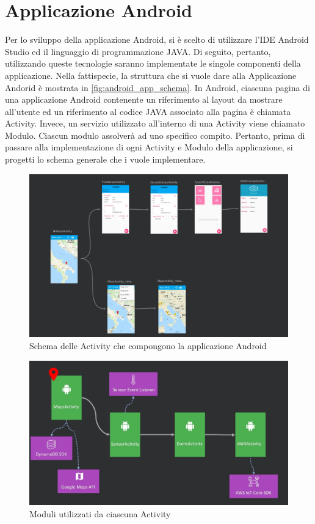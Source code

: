 \section{Applicazione Android}
Per lo sviluppo della applicazione Android, si è scelto di utilizzare l'IDE Android Studio ed il linguaggio di programmazione JAVA. Di seguito, pertanto, utilizzando queste tecnologie saranno implementate le singole componenti della applicazione. Nella fattispecie, la struttura che si vuole dare alla Applicazione Andorid è mostrata in \autoref{fig:android_app_schema}.
In Android, ciascuna pagina di una applicazione Android contenente un riferimento al layout da mostrare all'utente ed un riferimento al codice JAVA associato alla pagina è chiamata Activity. Invece, un servizio utilizzato all'interno di una Activity viene chiamato Modulo. Ciascun modulo assolverà ad uno specifico compito. Pertanto, prima di passare alla implementazione di ogni Activity e Modulo della applicazione, si progetti lo schema generale che i vuole implementare.\\
\begin{figure}
	\begin{center}
		\includegraphics[width=1\columnwidth]{images/android_app_schema}
	\end{center}
	\caption{Schema delle Activity che compongono la applicazione Android}
	\label{fig:android_app_schema}
\end{figure}
\begin{figure}
	\begin{center}
		\includegraphics[width=0.9\columnwidth]{images/android_app_schema_1}
	\end{center}
	\caption{Moduli utilizzati da ciascuna Activity}
	\label{fig:android_app_schema_1}
\end{figure}
